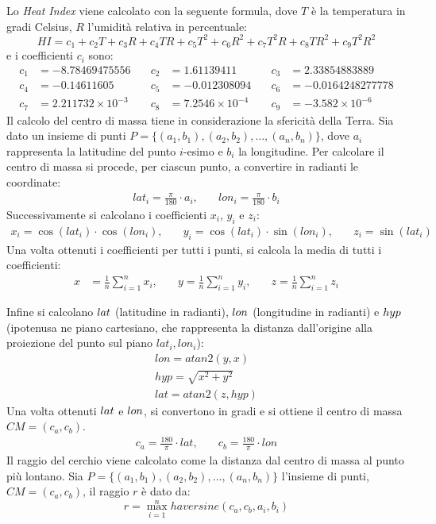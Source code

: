 Lo \textit{Heat Index} viene calcolato con la seguente formula, dove $T$ è la temperatura in gradi Celsius, $R$ l'umidità relativa in percentuale:
\[
	HI = c_1 + c_2 T + c_3 R + c_4 TR + c_5 T^2 + c_6 R^2 + c_7 T^2 R + c_8 TR^2 + c_9 T^2 R^2
\]
e i coefficienti $c_i$ sono:
\begin{align*}
	c_1 & = -8.78469475556          & \quad c_2 & = 1.61139411            & \quad c_3 & = 2.33854883889         \\
	c_4 & = -0.14611605             & \quad c_5 & = -0.012308094          & \quad c_6 & = -0.0164248277778      \\
	c_7 & = 2.211732 \times 10^{-3} & \quad c_8 & = 7.2546 \times 10^{-4} & \quad c_9 & = -3.582 \times 10^{-6}
\end{align*}
Il calcolo del centro di massa tiene in considerazione la sfericità della Terra. Sia dato un insieme di punti $P = \{(a_1, b_1), (a_2, b_2), \ldots, (a_n, b_n)\}$, dove $a_i$ rappresenta
la latitudine del punto $i$-esimo e $b_i$ la longitudine. Per calcolare il centro di massa si procede, per ciascun punto, a convertire in radianti le coordinate:
\begin{align*}
	lat_i = \frac{\pi}{180} \cdot a_i, & \quad lon_i = \frac{\pi}{180} \cdot b_i
\end{align*}
Successivamente si calcolano i coefficienti $x_i$, $y_i$ e $z_i$:
\begin{align*}
	x_i = \cos(lat_i) \cdot \cos(lon_i),       &
	\quad y_i = \cos(lat_i) \cdot \sin(lon_i), &
	\quad z_i = \sin(lat_i)
\end{align*}
Una volta ottenuti i coefficienti per tutti i punti, si calcola la media di tutti i coefficienti:
\begin{align*}
	x & = \frac{1}{n} \sum_{i=1}^{n} x_i, & \quad y = \frac{1}{n} \sum_{i=1}^{n} y_i, & \quad z = \frac{1}{n} \sum_{i=1}^{n} z_i
\end{align*}

Infine si calcolano ${lat}$ (latitudine in radianti), ${lon}$ (longitudine in radianti) e ${hyp}$ (ipotenusa ne piano cartesiano, che rappresenta la distanza dall'origine alla proiezione del punto sul piano $lat_i, lon_i$):
\begin{align*}
	lon = atan2(y, x)      \\
	hyp = \sqrt{x^2 + y^2} \\
	lat = atan2(z, hyp)
\end{align*}
Una volta ottenuti ${lat}$ e ${lon}$, si convertono in gradi e si ottiene il centro di massa $CM = (c_a, c_b)$.
\begin{align*}
	c_a = \frac{180}{\pi} \cdot lat, & \quad c_b = \frac{180}{\pi} \cdot lon
\end{align*}
Il raggio del cerchio viene calcolato come la distanza dal centro di massa al punto più lontano. Sia $P = \{(a_1, b_1), (a_2, b_2), \ldots, (a_n, b_n)\}$ l'insieme di punti, $CM = (c_a, c_b)$, il
raggio $r$ è dato da:
\[
	r = \max_{i=1}^{n} haversine(c_a, c_b, a_i, b_i)
\]


